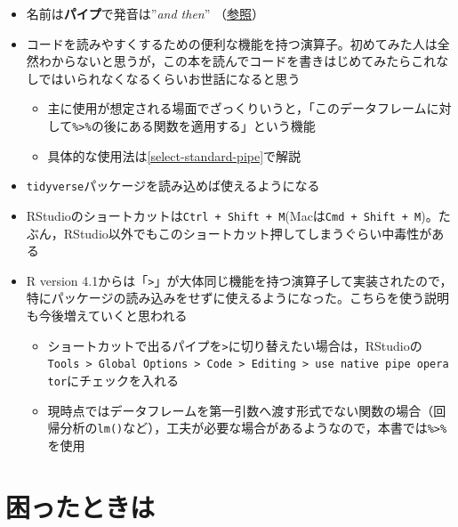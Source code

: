 \documentclass[
  xelatex,ja=standard, b5paper]{bxjsbook}
\providecommand{\tightlist}{%
  \setlength{\itemsep}{0pt}\setlength{\parskip}{0pt}}
\begin{document}
\begin{itemize}
\tightlist
\item
  名前は\textbf{パイプ}で発音は''\emph{and then}'' （\href{https://adv-r.hadley.nz/functions.html\#function-composition}{参照}）
\item
  コードを読みやすくするための便利な機能を持つ演算子。初めてみた人は全然わからないと思うが，この本を読んでコードを書きはじめてみたらこれなしではいられなくなるくらいお世話になると思う

  \begin{itemize}
  \tightlist
  \item
    主に使用が想定される場面でざっくりいうと，「このデータフレームに対して\texttt{\%\textgreater{}\%}の後にある関数を適用する」という機能
  \item
    具体的な使用法は\ref{select-standard-pipe}で解説
  \end{itemize}
\item
  \texttt{tidyverse}パッケージを読み込めば使えるようになる
\item
  RStudioのショートカットは\texttt{Ctrl\ +\ Shift\ +\ M}(Macは\texttt{Cmd\ +\ Shift\ +\ M})。たぶん，RStudio以外でもこのショートカット押してしまうぐらい中毒性がある
\item
  R version 4.1からは「\texttt{\textbar{}\textgreater{}}」が大体同じ機能を持つ演算子して実装されたので，特にパッケージの読み込みをせずに使えるようになった。こちらを使う説明も今後増えていくと思われる

  \begin{itemize}
  \tightlist
  \item
    ショートカットで出るパイプを\texttt{\textbar{}\textgreater{}}に切り替えたい場合は，RStudioの\texttt{Tools\ \textgreater{}\ Global\ Options\ \textgreater{}\ Code\ \textgreater{}\ Editing\ \textgreater{}\ use\ native\ pipe\ operator}にチェックを入れる
  \item
    現時点ではデータフレームを第一引数へ渡す形式でない関数の場合（回帰分析の\texttt{lm()}など），工夫が必要な場合があるようなので，本書では\texttt{\%\textgreater{}\%}を使用
  \end{itemize}
\end{itemize}

\hypertarget{p-help}{%
\section{困ったときは}\label{p-help}}
\end{document}
